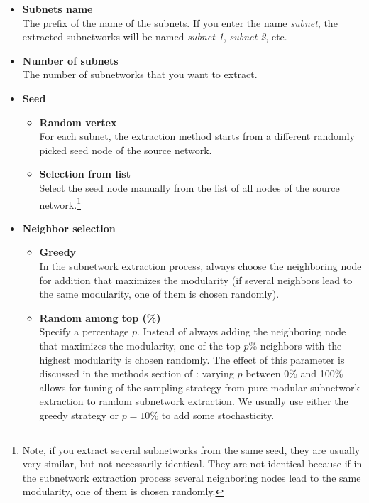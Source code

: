 \documentclass{llncs}
\newenvironment{mylist}{
\begin{itemize}
}{\end{itemize}}
\begin{document}
\begin{mylist}

\item \textbf{Subnets name}\\The prefix of the name of the subnets. If you enter the name \emph{subnet}, the extracted subnetworks will be named \emph{subnet-1}, \emph{subnet-2}, etc.\\

\item \textbf{Number of subnets}\\The number of subnetworks that you want to extract.\\

\item \textbf{Seed}
\begin{itemize}
\item \textbf{Random vertex}\\
For each subnet, the extraction method starts from a different randomly picked seed node of the source network.\\
\item \textbf{Selection from list}\\
Select the seed node manually from the list of all nodes of the source network.\footnote{Note, if you extract several subnetworks from the same seed, they are usually very similar, but not necessarily identical. They are not identical because if in the subnetwork extraction process several neighboring nodes lead to the same modularity, one of them is chosen randomly.}\\
\end{itemize}

\item \textbf{Neighbor selection}

\begin{itemize}
\item \textbf{Greedy}\\
In the subnetwork extraction process, always choose the neighboring node for addition that maximizes the modularity (if several neighbors lead to the same modularity, one of them is chosen randomly).\\
\item \textbf{Random among top (\%)}\\
Specify a percentage $p$. Instead of always adding the neighboring node that maximizes the modularity, one of the top $p$\% neighbors with the highest modularity is chosen randomly. The effect of this parameter is discussed in the methods section of \citet{Marbach2009}: varying $p$ between 0\% and 100\% allows for tuning of the sampling strategy from pure modular subnetwork extraction to random subnetwork extraction. We usually use either the greedy strategy or $p=10\%$ to add some stochasticity.
\end{itemize}

\end{mylist}
\end{document}
